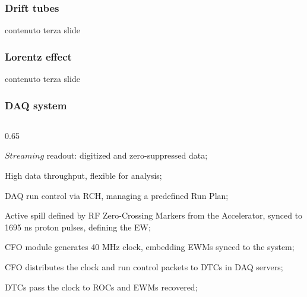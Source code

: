 \documentclass{beamer}
\begin{document}
\begin{frame}
    \frametitle{Drift tubes}
    contenuto terza slide
\end{frame}
\begin{frame}
    \frametitle{Lorentz effect}
    contenuto terza slide
\end{frame}
\begin{frame}
    \frametitle{DAQ system}
\begin{columns}
    \begin{column}{0.65\framewidth}
        \vspace{-3mm}
        \setlength{\leftmargini}{1.2em}
    \begin{itemize} 
   {\footnotesize     \item $Streaming$ readout: digitized and zero-suppressed data; 
        \vspace{-0.5mm}
        \item High data throughput, flexible for analysis; 
        \vspace{-0.5mm}
        \item DAQ run control via RCH, managing a 
        predefined Run Plan; 
        \vspace{-0.5mm}
        \item Active spill defined by RF Zero-Crossing Markers 
        from the Accelerator, synced to \\ 1695 ns proton pulses, defining the EW; 
        \vspace{-0.5mm}
        \item CFO module generates 40 MHz clock, embedding EWMs synced to the system; 
        \vspace{-0.5mm}
        \item CFO distributes the clock and run control packets to DTCs in DAQ servers; 
        \vspace{-0.5mm}
        \item DTCs pass the clock to ROCs and EWMs recovered; 
   
       
   
}
\end{itemize}
\end{column}
\end{columns}
\end{frame}
\end{document}
